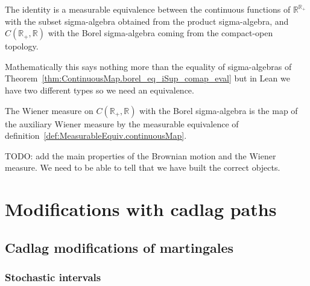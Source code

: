 \begin{definition}\label{def:MeasurableEquiv.continuousMap}
  \leanok
The identity is a measurable equivalence between the continuous functions of $\mathbb{R}^{\mathbb{R}_+}$ with the subset sigma-algebra obtained from the product sigma-algebra, and $C(\mathbb{R}_+, \mathbb{R})$ with the Borel sigma-algebra coming from the compact-open topology.

Mathematically this says nothing more than the equality of sigma-algebras of Theorem~\ref{thm:ContinuousMap.borel_eq_iSup_comap_eval} but in Lean we have two different types so we need an equivalence.
\end{definition}


\begin{definition}\label{def:wienerMeasure}
  \leanok
The Wiener measure on $C(\mathbb{R}_+, \mathbb{R})$ with the Borel sigma-algebra is the map of the auxiliary Wiener measure by the measurable equivalence of definition~\ref{def:MeasurableEquiv.continuousMap}.
\end{definition}


TODO: add the main properties of the Brownian motion and the Wiener measure.
We need to be able to tell that we have built the correct objects.


\chapter{Modifications with cadlag paths}

\section{Cadlag modifications of martingales}

\subsection{Stochastic intervals}


